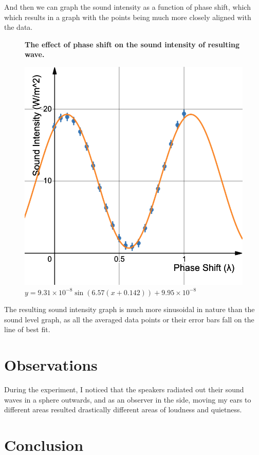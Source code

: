 \documentclass[index]{subfiles}
\begin{document}
And then we can graph the sound intensity as a function of phase shift, which which results in a graph with the points being much more closely aligned with the data.

\begin{figure}[H]
    \centering
    \textbf{The effect of phase shift on the sound intensity of resulting wave.}\medskip\par
    \includegraphics[scale=0.3]{res/graph-calc.png}
    \caption{\(y=9.31\times 10^{-8}\sin\left(6.57\left(x+0.142\right)\right)+9.95\times 10^{-8}\) }
\end{figure}

The resulting sound intensity graph is much more sinusoidal in nature than the sound level graph, as all the averaged data points or their error bars fall on the line of best fit.

\section{Observations}

During the experiment, I noticed that the speakers radiated out their sound waves in a sphere outwards, and as an observer in the side, moving my ears to different areas resulted drastically different areas of loudness and quietness.

\section{Conclusion}
\end{document}
